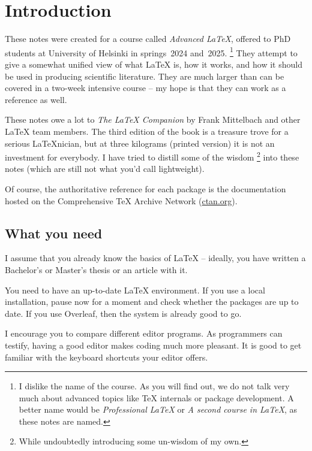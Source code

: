 \addtocounter{chapter}{-1}
\chapter{Introduction}


These notes were created for a course called \emph{Advanced \LaTeX},
offered to PhD students at University of Helsinki in springs~2024 and~2025.%
\footnote{I dislike the name of the course.
As you will find out, we do not talk very much about advanced topics like
\TeX{} internals or package development.
A better name would be \emph{Professional \LaTeX} or \emph{A second course in \LaTeX},
as these notes are named.}
They attempt to give a somewhat unified view of what \LaTeX{} is,
how it works, and how it should be used in producing scientific literature.
They are much larger than can be covered in a two-week intensive course
-- my hope is that they can work as a reference as well.

These notes owe a lot to \emph{The \LaTeX{} Companion} \cite{TLC}
by Frank Mittelbach and other \LaTeX{} team members.
The third edition of the book is a treasure trove for a serious \LaTeX nician,
but at three kilograms (printed version) it is not an investment for everybody.
I have tried to distill some of the wisdom%
\footnote{While undoubtedly introducing some un-wisdom of my own.}
into these notes (which are still not what you'd call lightweight).

Of course, the authoritative reference for each package is the documentation hosted on
the Comprehensive \TeX{} Archive Network (\url{ctan.org}).



%
%
\section{What you need}

I assume that you already know the basics of \LaTeX{}
-- ideally, you have written a Bachelor's or Master's thesis or an article with it.

You need to have an up-to-date \LaTeX{} environment.
If you use a local installation, pause now for a moment
and check whether the packages are up to date.
If you use Overleaf, then the system is already good to go.

I encourage you to compare different editor programs.
As programmers can testify, having a good editor makes coding much more pleasant.
It is good to get familiar with the keyboard shortcuts your editor offers.

